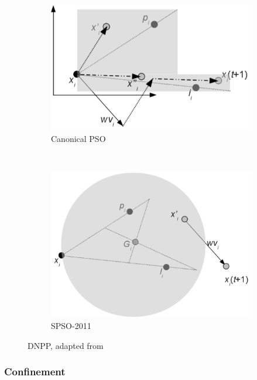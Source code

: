 \documentclass{csfourzero}
\begin{document}
\begin{figure}
  \centering
  \begin{subfigure}[b]{0.4\textwidth}
    \includegraphics[width=\textwidth]{dnpp_canonical.png}
    \caption{Canonical PSO}
    \label{fig:dnpp_canonical}
  \end{subfigure}
  ~
  \begin{subfigure}[b]{0.4\textwidth}
    \includegraphics[width=\textwidth]{dnpp_spso11.png}
    \caption{SPSO-2011}
    \label{fig:dnpp_spso11}
  \end{subfigure}
  \caption{DNPP, adapted from~\cite{ZambranoBigiarini:2013dl}}
  \label{fig:dnpp}
\end{figure}

\subsubsection{Confinement} %
\end{document}
